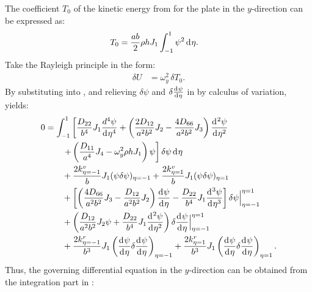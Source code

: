 \documentclass[preprint,12pt]{elsarticle}
\newcommand{\id}{\mathrm{d}\mkern1mu}
\begin{document}
The coefficient $T_0$ of the kinetic energy from  for the plate in the $y$-direction can be expressed as:
%
\begin{equation}\label{eq:kine_energyy}
	\begin{split}
		T_0 &= \frac{ab}{2} \rho h J_1 \int_{-1}^{1} \psi^2 \, \id\eta.
	\end{split}
\end{equation}
%
Take the Rayleigh principle in the form:
%
\begin{equation}\label{eq:Rayleighy}
	\begin{split}
		\delta U &= \omega_y^2 \, \delta T_0.
	\end{split}
\end{equation}
%
By substituting  into , and relieving $ \delta \psi $ and $\delta\frac{\id \psi}{\id \eta}$ in  by calculus of variation, yields:
%
\begin{equation}\label{eq:Rayleighy2}
	\begin{split}
		0 &= \int_{-1}^{1} \left[ \frac{D_{22}}{b^4} J_1 \frac{d^4 \psi}{\id \eta^4} 
		+ \left( \frac{2D_{12}}{a^2b^2} J_2 - \frac{4D_{66}}{a^2b^2} J_3 \right) \frac{\id^2 \psi}{\id \eta^2} \right. \\
		&\qquad \left. + \left( \frac{D_{11}}{a^4} J_4 - \omega_y^2 \rho h J_1 \right) \psi \right] \delta \psi \, \id\eta \\
		&\qquad + \frac{2k^v_{\eta=-1}}{b} J_1 (\psi \delta \psi)_{\eta=-1} 
		+ \frac{2k^v_{\eta=1}}{b} J_1 (\psi \delta \psi)_{\eta=1} \\
		&\qquad + \left[ \left( \frac{4D_{66}}{a^2b^2} J_3 - \frac{D_{12}}{a^2b^2} J_2 \right) \frac{\id \psi}{\id \eta} 
		- \frac{D_{22}}{b^4} J_1 \frac{\id^3 \psi}{\id \eta^3} \right] \delta \psi \Big|^{\eta=1}_{\eta=-1} \\
		&\qquad + \left( \frac{D_{12}}{a^2b^2} J_2 \psi + \frac{D_{22}}{b^4} J_1 \frac{\id^2 \psi}{\id \eta^2} \right) 
		\delta\frac{\id  \psi}{\id \eta} \Big|^{\eta=1}_{\eta=-1} \\
		&\qquad + \frac{2k^r_{\eta=-1}}{b^3} J_1 \left( \frac{\id \psi}{\id \eta} \delta\frac{\id \psi}{\id \eta} \right)_{\eta=-1} 
		+ \frac{2k^r_{\eta=1}}{b^3} J_1 \left( \frac{\id \psi}{\id \eta} \delta\frac{\id \psi}{\id \eta} \right)_{\eta=1}.
	\end{split}
\end{equation}
%
Thus, the governing differential equation in the $y$-direction can be obtained from the integration part in :
\end{document}
